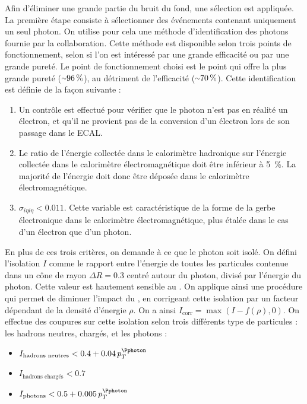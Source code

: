 Afin d'éliminer une grande partie du bruit du fond, une sélection est appliquée. La première étape consiste à sélectionner des événements contenant uniquement un seul photon. On utilise pour cela une méthode d'identification des photons fournie par la collaboration. Cette méthode est disponible selon trois points de fonctionnement, selon si l'on est intéressé par une grande efficacité ou par une grande pureté. Le point de fonctionnement choisi est le point qui offre la plus grande pureté ($\tilde \SI{96}{\%}$), au détriment de l'efficacité ($\tilde \SI{70}{\%}$). Cette identification est définie de la façon suivante :

\begin{enumerate}
    \item Un contrôle est effectué pour vérifier que le photon n'est pas en réalité un électron, et qu'il ne provient pas de la conversion d'un électron lors de son passage dans le ECAL.
    \item Le ratio de l'énergie collectée dans le calorimètre hadronique sur l'énergie collectée dans le calorimètre électromagnétique doit être inférieur à \SI{5}{\%}. La majorité de l'énergie doit donc être déposée dans le calorimètre électromagnétique.
    \item $\sigma_{i\eta i\eta} < \num{0.011}$. Cette variable est caractéristique de la forme de la gerbe électronique dans le calorimètre électromagnétique, plus étalée dans le cas d'un électron que d'un photon. 
\end{enumerate}

En plus de ces trois critères, on demande à ce que le photon soit isolé. On défini l'isolation $I$ comme le rapport entre l'énergie de toutes les particules \pf contenue dans un cône de rayon $\Delta R = \num{0.3}$ centré autour du photon, divisé par l'énergie du photon. Cette valeur est hautement sensible au \pu. On applique ainsi une procédure qui permet de diminuer l'impact du \pu, en corrigeant cette isolation par un facteur dépendant de la densité d'énergie $\rho$. On a ainsi $I_\text{corr} = \max{\left(I - f(\rho), 0\right)}$. On effectue des coupures sur cette isolation selon trois différents type de particules : les hadrons neutres, chargés, et les photons :

\begin{itemize}
    \item $I_\text{hadrons neutres} < \num{0.4} + \num{0.04} \, p_T^{\Pphoton}$
    \item $I_\text{hadrons chargés} < \num{0.7}$
    \item $I_\text{photons} < \num{0.5} + \num{0.005} \, p_T^{\Pphoton}$
\end{itemize}

